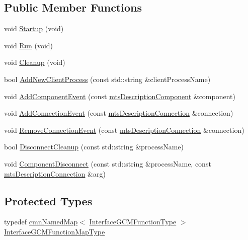 \subsection*{Public Member Functions}
\begin{DoxyCompactItemize}
\item 
void \hyperlink{classmts_manager_component_server_ab4a7ff516bbe04b439039a2342e48455}{Startup} (void)
\item 
void \hyperlink{classmts_manager_component_server_a18c682506c92fd6e0523e3925f1e637b}{Run} (void)
\item 
void \hyperlink{classmts_manager_component_server_a3cd58f066e7023e2bc000232b178ee55}{Cleanup} (void)
\item 
bool \hyperlink{classmts_manager_component_server_a89c2c3df2989610b4ae2fecb70d3184f}{Add\+New\+Client\+Process} (const std\+::string \&client\+Process\+Name)
\item 
void \hyperlink{classmts_manager_component_server_a51717169473ba879ea40f671dd5f5d27}{Add\+Component\+Event} (const \hyperlink{classmts_description_component}{mts\+Description\+Component} \&component)
\item 
void \hyperlink{classmts_manager_component_server_a8db723af6b218fa2a0c648664d06da1f}{Add\+Connection\+Event} (const \hyperlink{classmts_description_connection}{mts\+Description\+Connection} \&connection)
\item 
void \hyperlink{classmts_manager_component_server_a77c2a4abdf23b89b842615fa50c0cf3c}{Remove\+Connection\+Event} (const \hyperlink{classmts_description_connection}{mts\+Description\+Connection} \&connection)
\item 
bool \hyperlink{classmts_manager_component_server_a033499e692bea2a893927d637841c1c4}{Disconnect\+Cleanup} (const std\+::string \&process\+Name)
\item 
void \hyperlink{classmts_manager_component_server_a1dcd5082d9a306e6a47b1b22aec218f3}{Component\+Disconnect} (const std\+::string \&process\+Name, const \hyperlink{classmts_description_connection}{mts\+Description\+Connection} \&arg)
\end{DoxyCompactItemize}
\subsection*{Protected Types}
\begin{DoxyCompactItemize}
\item 
typedef \hyperlink{classcmn_named_map}{cmn\+Named\+Map}$<$ \hyperlink{structmts_manager_component_server_1_1_interface_g_c_m_function_type}{Interface\+G\+C\+M\+Function\+Type} $>$ \hyperlink{classmts_manager_component_server_a9b456473c566d9993274d3de0f124f7c}{Interface\+G\+C\+M\+Function\+Map\+Type}
\end{DoxyCompactItemize}

